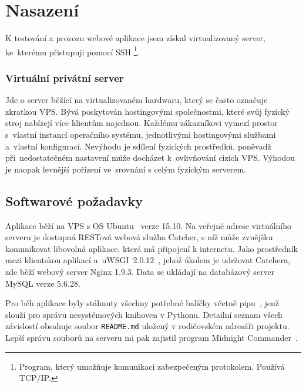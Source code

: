 \chapter{Nasazení}

K testování a provozu webové aplikace jsem získal virtualizovaný server, ke~kterému přistupuji pomocí SSH
\footnote{Program, který umožňuje komunikaci zabezpečeným protokolem. Používá TCP/IP.}.

\subsection*{Virtuální privátní server}

Jde o server běžící na virtualizovaném hardwaru, který se často označuje zkratkou VPS.
Bývá poskytován hostingovými společnostmi, které svůj fyzický stroj nabízejí více klientům najednou.
Každému zákazníkovi vymezí prostor s~vlastní instancí operačního systému, jednotlivými hostingovými službami
a~vlastní konfigurací. Nevýhodu je sdílení fyzických prostředků, poněvadž při~nedostatečném nastavení
může docházet k~ovlivňování cizích VPS. Výhodou je naopak levnější pořízení ve~srovnání s celým fyzickým serverem.

\section{Softwarové požadavky}


Aplikace běží na VPS s OS Ubuntu~\cite{ubuntu} verze 15.10. Na veřejné adrese virtuálního serveru
je dostupná RESTová webová služba Catcher, s níž může zvnějšku komunikovat libovolná aplikace,
která má připojení k internetu. Jako prostředník mezi klientskou aplikací
a~uWSGI~2.0.12~\cite{python_uwsgi}, jehož úkolem je udržovat Catchera, zde běží webový server Nginx 1.9.3.
Data se ukládají na databázový server MySQL verze 5.6.28.

Pro běh aplikace byly stáhnuty všechny potřebné balíčky včetně pipu~\cite{python_pip},
jenž slouží pro správu nesystémových knihoven v Pythonu. Detailní seznam všech závislostí obsahuje soubor
\texttt{README.md} uložený v rodičovském adresáři projektu. Lepší správu souborů na serveru mi pak zajistil program Midnight Commander~\cite{mc}.

